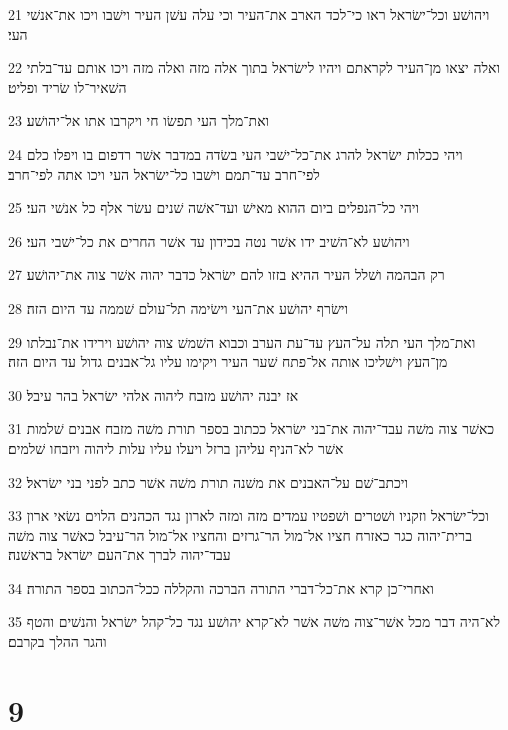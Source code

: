 \par 21 ויהושׁע וכל־ישׂראל ראו כי־לכד הארב את־העיר וכי עלה עשׁן העיר וישׁבו ויכו את־אנשׁי העי׃
\par 22 ואלה יצאו מן־העיר לקראתם ויהיו לישׂראל בתוך אלה מזה ואלה מזה ויכו אותם עד־בלתי השׁאיר־לו שׂריד ופליט׃
\par 23 ואת־מלך העי תפשׂו חי ויקרבו אתו אל־יהושׁע׃
\par 24 ויהי ככלות ישׂראל להרג את־כל־ישׁבי העי בשׂדה במדבר אשׁר רדפום בו ויפלו כלם לפי־חרב עד־תמם וישׁבו כל־ישׂראל העי ויכו אתה לפי־חרב׃
\par 25 ויהי כל־הנפלים ביום ההוא מאישׁ ועד־אשׁה שׁנים עשׂר אלף כל אנשׁי העי׃
\par 26 ויהושׁע לא־השׁיב ידו אשׁר נטה בכידון עד אשׁר החרים את כל־ישׁבי העי׃
\par 27 רק הבהמה ושׁלל העיר ההיא בזזו להם ישׂראל כדבר יהוה אשׁר צוה את־יהושׁע׃
\par 28 וישׂרף יהושׁע את־העי וישׂימה תל־עולם שׁממה עד היום הזה׃
\par 29 ואת־מלך העי תלה על־העץ עד־עת הערב וכבוא השׁמשׁ צוה יהושׁע וירידו את־נבלתו מן־העץ וישׁליכו אותה אל־פתח שׁער העיר ויקימו עליו גל־אבנים גדול עד היום הזה׃
\par 30 אז יבנה יהושׁע מזבח ליהוה אלהי ישׂראל בהר עיבל׃
\par 31 כאשׁר צוה משׁה עבד־יהוה את־בני ישׂראל ככתוב בספר תורת משׁה מזבח אבנים שׁלמות אשׁר לא־הניף עליהן ברזל ויעלו עליו עלות ליהוה ויזבחו שׁלמים׃
\par 32 ויכתב־שׁם על־האבנים את משׁנה תורת משׁה אשׁר כתב לפני בני ישׂראל׃
\par 33 וכל־ישׂראל וזקניו ושׁטרים ושׁפטיו עמדים מזה ומזה לארון נגד הכהנים הלוים נשׂאי ארון ברית־יהוה כגר כאזרח חציו אל־מול הר־גרזים והחציו אל־מול הר־עיבל כאשׁר צוה משׁה עבד־יהוה לברך את־העם ישׂראל בראשׁנה׃
\par 34 ואחרי־כן קרא את־כל־דברי התורה הברכה והקללה ככל־הכתוב בספר התורה׃
\par 35 לא־היה דבר מכל אשׁר־צוה משׁה אשׁר לא־קרא יהושׁע נגד כל־קהל ישׂראל והנשׁים והטף והגר ההלך בקרבם׃

\chapter{9}

